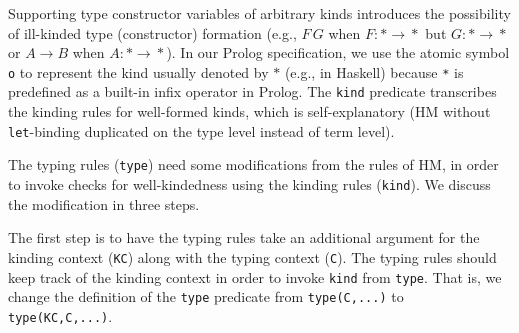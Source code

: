 \documentclass[runningheads,a4paper]{llncs}
\begin{document}
Supporting type constructor variables of
arbitrary kinds introduces the possibility of ill-kinded type (constructor)
formation (e.g., $F\,G$ when $F:*\!\to\!*$ but $G:*\!\to\!*$ \;or\; 
$A\!\to\!B$ when $A:*\!\to\!*$). In our Prolog specification, we use
the atomic symbol \verb|o| to represent the kind usually denoted by $*$
(e.g., in Haskell) because \verb|*| is predefined as a built-in infix
operator in Prolog. The \verb|kind| predicate transcribes the kinding rules
for well-formed kinds, which is self-explanatory (HM without
\texttt{let}-binding duplicated on the type level instead of term level).

The typing rules (\verb|type|) need some modifications from the rules of HM,
in order to invoke checks for well-kindedness using the kinding rules
(\verb|kind|). We discuss the modification in three steps.

The first step is to have the typing rules take an additional argument for
the kinding context (\verb|KC|) along with the typing context (\verb|C|).
The typing rules
should keep track of the kinding context in order to invoke \verb|kind|
from \verb|type|.  That is, we change the definition of the \verb|type|
predicate from \verb|type(C,...)| to \verb|type(KC,C,...)|.
\end{document}
